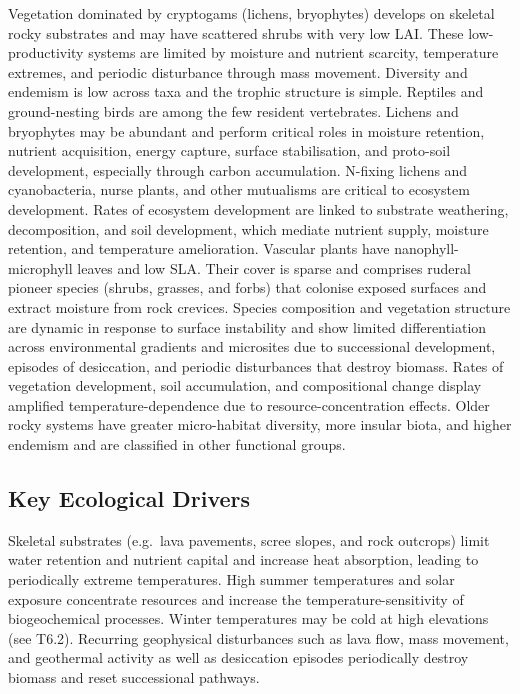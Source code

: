 \documentclass[
  letterpaper,
  DIV=11,
  numbers=noendperiod]{scrartcl}
\begin{document}
Vegetation dominated by cryptogams (lichens, bryophytes) develops on
skeletal rocky substrates and may have scattered shrubs with very low
LAI. These low-productivity systems are limited by moisture and nutrient
scarcity, temperature extremes, and periodic disturbance through mass
movement. Diversity and endemism is low across taxa and the trophic
structure is simple. Reptiles and ground-nesting birds are among the few
resident vertebrates. Lichens and bryophytes may be abundant and perform
critical roles in moisture retention, nutrient acquisition, energy
capture, surface stabilisation, and proto-soil development, especially
through carbon accumulation. N-fixing lichens and cyanobacteria, nurse
plants, and other mutualisms are critical to ecosystem development.
Rates of ecosystem development are linked to substrate weathering,
decomposition, and soil development, which mediate nutrient supply,
moisture retention, and temperature amelioration. Vascular plants have
nanophyll-microphyll leaves and low SLA. Their cover is sparse and
comprises ruderal pioneer species (shrubs, grasses, and forbs) that
colonise exposed surfaces and extract moisture from rock crevices.
Species composition and vegetation structure are dynamic in response to
surface instability and show limited differentiation across
environmental gradients and microsites due to successional development,
episodes of desiccation, and periodic disturbances that destroy biomass.
Rates of vegetation development, soil accumulation, and compositional
change display amplified temperature-dependence due to
resource-concentration effects. Older rocky systems have greater
micro-habitat diversity, more insular biota, and higher endemism and are
classified in other functional groups.

\subsection{Key Ecological Drivers}\label{key-ecological-drivers-82}

Skeletal substrates (e.g.~lava pavements, scree slopes, and rock
outcrops) limit water retention and nutrient capital and increase heat
absorption, leading to periodically extreme temperatures. High summer
temperatures and solar exposure concentrate resources and increase the
temperature-sensitivity of biogeochemical processes. Winter temperatures
may be cold at high elevations (see T6.2). Recurring geophysical
disturbances such as lava flow, mass movement, and geothermal activity
as well as desiccation episodes periodically destroy biomass and reset
successional pathways.
\end{document}
